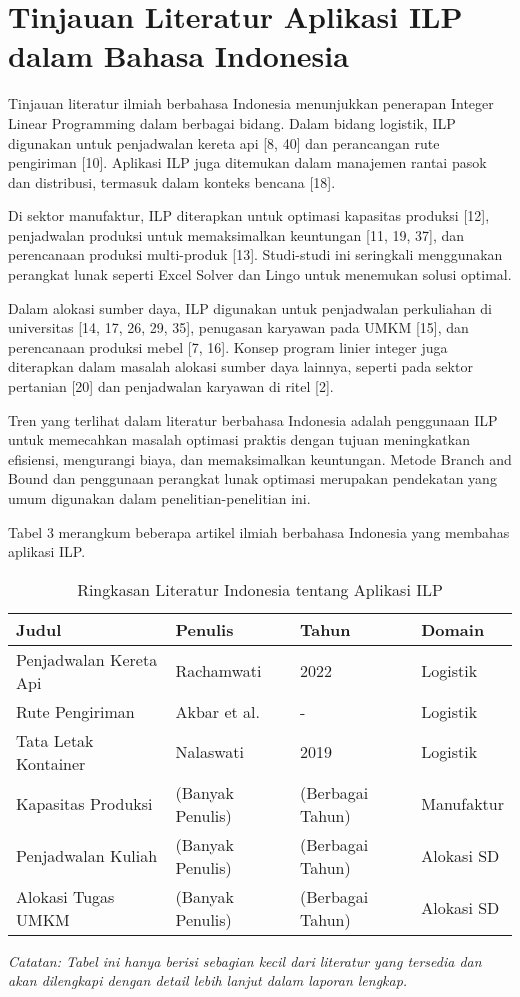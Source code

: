 \documentclass{IEEEtran}
\begin{document}
\section{Tinjauan Literatur Aplikasi ILP dalam Bahasa Indonesia}

Tinjauan literatur ilmiah berbahasa Indonesia menunjukkan penerapan Integer Linear Programming dalam berbagai bidang. Dalam bidang logistik, ILP digunakan untuk penjadwalan kereta api [8, 40] dan perancangan rute pengiriman [10]. Aplikasi ILP juga ditemukan dalam manajemen rantai pasok dan distribusi, termasuk dalam konteks bencana [18].

Di sektor manufaktur, ILP diterapkan untuk optimasi kapasitas produksi [12], penjadwalan produksi untuk memaksimalkan keuntungan [11, 19, 37], dan perencanaan produksi multi-produk [13]. Studi-studi ini seringkali menggunakan perangkat lunak seperti Excel Solver dan Lingo untuk menemukan solusi optimal.

Dalam alokasi sumber daya, ILP digunakan untuk penjadwalan perkuliahan di universitas [14, 17, 26, 29, 35], penugasan karyawan pada UMKM [15], dan perencanaan produksi mebel [7, 16]. Konsep program linier integer juga diterapkan dalam masalah alokasi sumber daya lainnya, seperti pada sektor pertanian [20] dan penjadwalan karyawan di ritel [2].

Tren yang terlihat dalam literatur berbahasa Indonesia adalah penggunaan ILP untuk memecahkan masalah optimasi praktis dengan tujuan meningkatkan efisiensi, mengurangi biaya, dan memaksimalkan keuntungan. Metode Branch and Bound dan penggunaan perangkat lunak optimasi merupakan pendekatan yang umum digunakan dalam penelitian-penelitian ini.

Tabel 3 merangkum beberapa artikel ilmiah berbahasa Indonesia yang membahas aplikasi ILP.

\begin{table}[h!]
    \centering
    \caption{Ringkasan Literatur Indonesia tentang Aplikasi ILP}
    \label{tab:indonesian_literature}
    \begin{tabular}{@{}llll@{}}
        \toprule
        Judul & Penulis & Tahun & Domain \\
        \midrule
        Penjadwalan Kereta Api & Rachamwati & 2022 & Logistik \\
        Rute Pengiriman & Akbar et al. & - & Logistik \\
        Tata Letak Kontainer & Nalaswati & 2019 & Logistik \\
        Kapasitas Produksi & (Banyak Penulis) & (Berbagai Tahun) & Manufaktur \\
        Penjadwalan Kuliah & (Banyak Penulis) & (Berbagai Tahun) & Alokasi SD \\
        Alokasi Tugas UMKM & (Banyak Penulis) & (Berbagai Tahun) & Alokasi SD \\
        \bottomrule
    \end{tabular}
\end{table}
\textit{Catatan: Tabel ini hanya berisi sebagian kecil dari literatur yang tersedia dan akan dilengkapi dengan detail lebih lanjut dalam laporan lengkap.}
\end{document}
